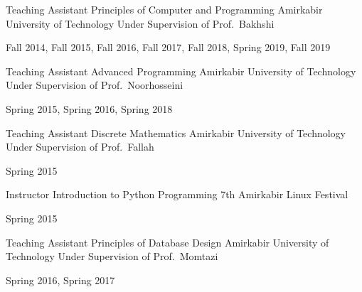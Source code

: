 

\begin{cventries}

  \cventry
    {Teaching Assistant} %
    {Principles of Computer and Programming} %
    {Amirkabir University of Technology} %
    {Under Supervision of Prof.\ Bakhshi} %
    {
      \begin{cvitems} %
        Fall 2014, Fall 2015, Fall 2016, Fall 2017, Fall 2018, Spring 2019, Fall 2019
      \end{cvitems}
    }

  \cventry
    {Teaching Assistant} %
    {Advanced Programming} %
    {Amirkabir University of Technology} %
    {Under Supervision of Prof.\ Noorhosseini} %
    {
      \begin{cvitems} %
        Spring 2015, Spring 2016, Spring 2018
      \end{cvitems}
    }

  \cventry
    {Teaching Assistant} %
    {Discrete Mathematics} %
    {Amirkabir University of Technology} %
    {Under Supervision of Prof.\ Fallah} %
    {
      \begin{cvitems} %
        Spring 2015
      \end{cvitems}
    }

  \cventry
    {Instructor} %
    {Introduction to Python Programming} %
    {7th Amirkabir Linux Festival} %
    {} %
    {
      \begin{cvitems} %
        Spring 2015
      \end{cvitems}
    }

  \cventry
    {Teaching Assistant} %
    {Principles of Database Design} %
    {Amirkabir University of Technology} %
    {Under Supervision of Prof.\ Momtazi} %
    {
      \begin{cvitems} %
        Spring 2016, Spring 2017
      \end{cvitems}
    }


\end{cventries}
